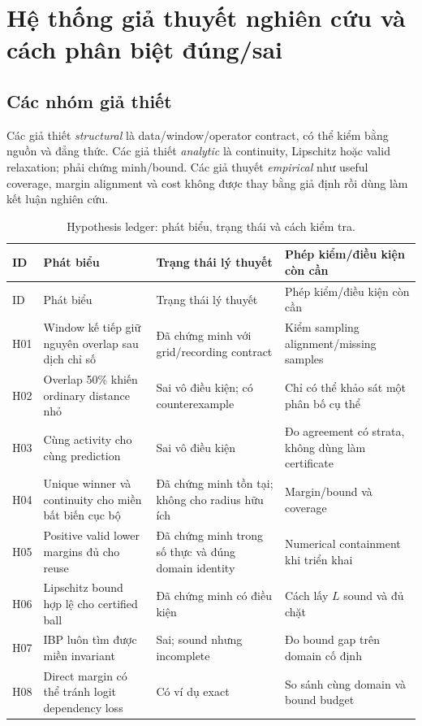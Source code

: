 \documentclass[11pt,a4paper]{article}
\theoremstyle{remark}
\begin{document}
\section{Hệ thống giả thuyết nghiên cứu và cách phân biệt đúng/sai}
\subsection{Các nhóm giả thiết}
Các giả thiết \emph{structural} là data/window/operator contract, có thể
kiểm bằng nguồn và đẳng thức. Các giả thiết \emph{analytic} là continuity,
Lipschitz hoặc valid relaxation; phải chứng minh/bound. Các giả thuyết
\emph{empirical} như useful coverage, margin alignment và cost không được
thay bằng giả định rồi dùng làm kết luận nghiên cứu.

\begin{longtable}{@{}p{0.8cm}p{4.0cm}p{4.3cm}p{3.9cm}@{}}
\caption{Hypothesis ledger: phát biểu, trạng thái và cách kiểm tra.}
\label{tab:hypotheses}\\\toprule
ID & Phát biểu & Trạng thái lý thuyết & Phép kiểm/điều kiện còn cần\\\midrule
\endfirsthead
\toprule ID & Phát biểu & Trạng thái lý thuyết & Phép kiểm/điều kiện còn cần\\\midrule
\endhead
H01 & Window kế tiếp giữ nguyên overlap sau dịch chỉ số & Đã chứng minh với
grid/recording contract & Kiểm sampling alignment/missing samples\\
H02 & Overlap 50\% khiến ordinary distance nhỏ & Sai vô điều kiện; có
counterexample & Chỉ có thể khảo sát một phân bố cụ thể\\
H03 & Cùng activity cho cùng prediction & Sai vô điều kiện & Đo agreement
có strata, không dùng làm certificate\\
H04 & Unique winner và continuity cho miền bất biến cục bộ & Đã chứng minh
tồn tại; không cho radius hữu ích & Margin/bound và coverage\\
H05 & Positive valid lower margins đủ cho reuse & Đã chứng minh trong số
thực và đúng domain identity & Numerical containment khi triển khai\\
H06 & Lipschitz bound hợp lệ cho certified ball & Đã chứng minh có điều kiện
& Cách lấy $L$ sound và đủ chặt\\
H07 & IBP luôn tìm được miền invariant & Sai; sound nhưng incomplete
& Đo bound gap trên domain cố định\\
H08 & Direct margin có thể tránh logit dependency loss & Có ví dụ exact
& So sánh cùng domain và bound budget\\

\end{longtable}
\end{document}
